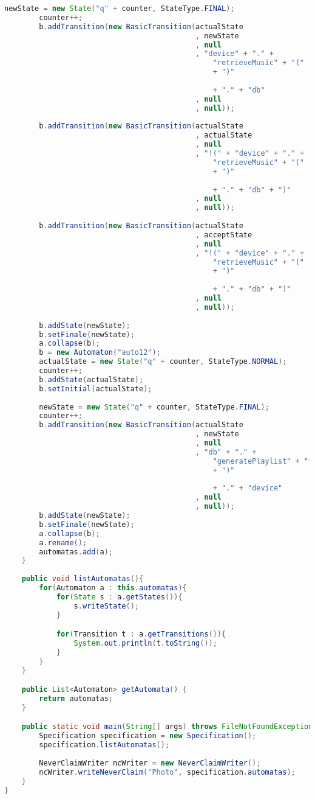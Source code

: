 \begin{lstlisting}[language=java, caption={\textit{Specification} osztály.},captionpos=b,label=specification_class]
		newState = new State("q" + counter, StateType.FINAL);
		counter++;
		b.addTransition(new BasicTransition(actualState
											, newState
											, null
											, "device" + "." +	
												"retrieveMusic" + "("
												+ ")"
												
												+ "." + "db"
											, null
											, null));
											
		b.addTransition(new BasicTransition(actualState
											, actualState
											, null
											, "!(" + "device" + "." +	
												"retrieveMusic" + "("
												+ ")"
												
												+ "." + "db" + ")"
											, null
											, null));
											
		b.addTransition(new BasicTransition(actualState
											, acceptState
											, null
											, "!(" + "device" + "." +	
												"retrieveMusic" + "("
												+ ")"
												
												+ "." + "db" + ")"
											, null
											, null));
										
		b.addState(newState);
		b.setFinale(newState);
		a.collapse(b);
		b = new Automaton("auto12");
		actualState = new State("q" + counter, StateType.NORMAL);
		counter++;
		b.addState(actualState);
		b.setInitial(actualState);
												
		newState = new State("q" + counter, StateType.FINAL);
		counter++;
		b.addTransition(new BasicTransition(actualState
											, newState
											, null
											, "db" + "." +	
												"generatePlaylist" + "("
												+ ")"
												
												+ "." + "device"
											, null
											, null));
		b.addState(newState);
		b.setFinale(newState);
		a.collapse(b);
		a.rename();
		automatas.add(a);
	}
	
	public void listAutomatas(){
		for(Automaton a : this.automatas){
			for(State s : a.getStates()){
				s.writeState();	
			}

			for(Transition t : a.getTransitions()){
				System.out.println(t.toString());
			}
		}
	}

	public List<Automaton> getAutomata() {
		return automatas;
	}

	public static void main(String[] args) throws FileNotFoundException, UnsupportedEncodingException {
		Specification specification = new Specification();
		specification.listAutomatas();
		
		NeverClaimWriter ncWriter = new NeverClaimWriter();
		ncWriter.writeNeverClaim("Photo", specification.automatas);
	}
}
\end{lstlisting}

